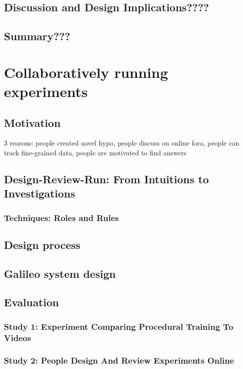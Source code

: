 \section{Discussion and Design Implications????}
\section{Summary???}



\chapter{Collaboratively running experiments}

\section{Motivation}
3 reasons: people created novel hypo, people discuss on online fora, people can track fine-grained data, people are motivated to find answers


\section{Design-Review-Run: From Intuitions to Investigations}
\subsection{Techniques: Roles and Rules}

\section{Design process}

\section{Galileo system design}

\section{Evaluation}
\subsection{Study 1: Experiment Comparing Procedural Training To Videos}
\subsection{Study 2: People Design And Review Experiments Online}

